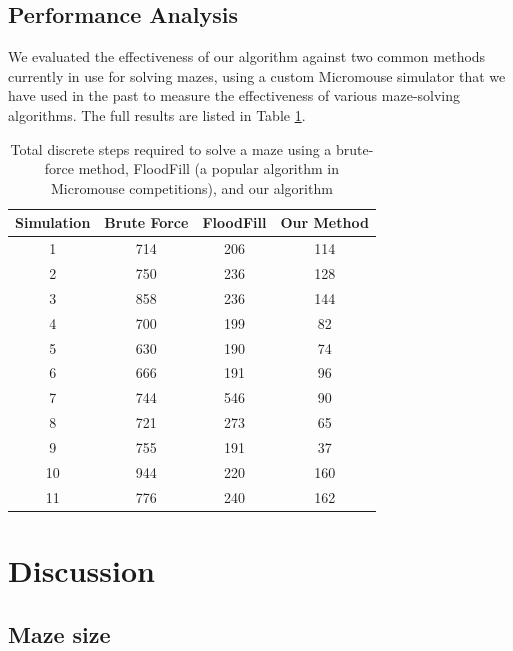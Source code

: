 \documentclass[10pt,twocolumn,letterpaper]{article}
\begin{document}


\subsection{Performance Analysis} %
\label{sub:performance_analysis}

We evaluated the effectiveness of our algorithm against two common methods currently in use for solving mazes, using a
custom Micromouse simulator that we have used in the past to measure the effectiveness of various maze-solving
algorithms.  The full results are listed in Table \ref{tab:performance}.

\begin{table}[!h]
	\centering
	\begin{tabular}{|c|c|c|c|}
		\hline
		\textbf{Simulation} & \textbf{Brute Force} & \textbf{FloodFill} & \textbf{Our Method} \\ \hline
		1 & 714 & 206 & 114 \\ \hline
		2 & 750 & 236 & 128 \\ \hline
		3 & 858 & 236 & 144 \\ \hline
		4 & 700 & 199 & 82 \\ \hline
		5 & 630 & 190 & 74 \\ \hline
		6 & 666 & 191 & 96 \\ \hline
		7 & 744 & 546 & 90 \\ \hline
		8 & 721 & 273 & 65 \\ \hline
		9 & 755 & 191 & 37 \\ \hline
		10 & 944 & 220 & 160 \\ \hline
		11 & 776 & 240 & 162 \\ \hline
	\end{tabular}
	\caption{Total discrete steps required to solve a maze using a brute-force method, FloodFill (a popular algorithm in Micromouse competitions), and our algorithm}
	\label{tab:performance}
\end{table}

\section{Discussion}
\label{sec:discussion}

\subsection{Maze size} %
\label{sub:maze_size}
\end{document}
